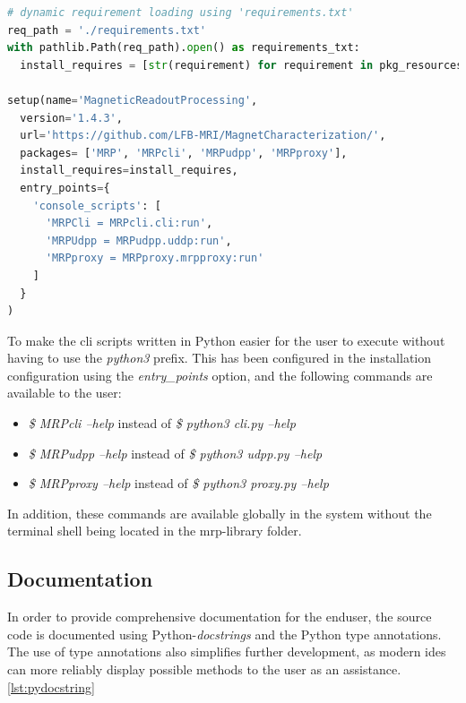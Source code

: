 \begin{lstlisting}[language=Python, caption={setup.py with dynamic requirement parsing used given requirements.txt}, label=lst:setup_py_req]
# dynamic requirement loading using 'requirements.txt'
req_path = './requirements.txt'
with pathlib.Path(req_path).open() as requirements_txt:
  install_requires = [str(requirement) for requirement in pkg_resources.parse_requirements(requirements_txt)]

setup(name='MagneticReadoutProcessing',
  version='1.4.3',
  url='https://github.com/LFB-MRI/MagnetCharacterization/',
  packages= ['MRP', 'MRPcli', 'MRPudpp', 'MRPproxy'],
  install_requires=install_requires,
  entry_points={
    'console_scripts': [
      'MRPCli = MRPcli.cli:run',
      'MRPUdpp = MRPudpp.uddp:run',
      'MRPproxy = MRPproxy.mrpproxy:run'
    ]
  }
)
\end{lstlisting}

To make the \gls{cli} scripts written in Python easier for the user to
execute without having to use the \emph{python3} prefix. This has been
configured in the installation configuration using the
\emph{entry\_points} option, and the following commands are available to
the user:

\begin{itemize}
\tightlist
\item
  \emph{\$ MRPcli --help} instead of \emph{\$ python3 cli.py --help}
\item
  \emph{\$ MRPudpp --help} instead of \emph{\$ python3 udpp.py --help}
\item
  \emph{\$ MRPproxy --help} instead of \emph{\$ python3 proxy.py --help}
\end{itemize}

In addition, these commands are available globally in the system without
the terminal shell being located in the \gls{mrp}-library folder.

\hypertarget{documentation}{%
\subsection{Documentation}\label{documentation}}

In order to provide comprehensive documentation for the enduser, the
source code is documented using Python-\emph{docstrings}
\cite{PythonDocstringReference} and the Python type annotations. The
use of type annotations also simplifies further development, as modern
\gls{ide}s can more reliably display possible methods to the user as an
assistance. \ref{lst:pydocstring}

